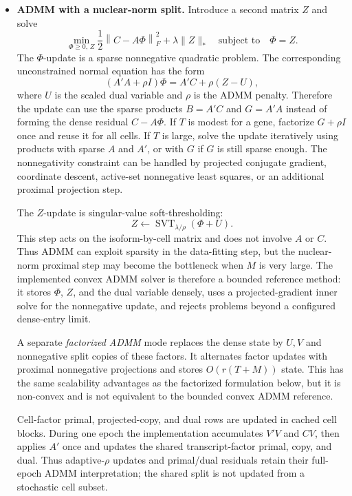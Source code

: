 \documentclass[11pt]{article}
\begin{document}
\begin{itemize}[leftmargin=*]
  \item \textbf{ADMM with a nuclear-norm split.} Introduce a second matrix
  \(Z\) and solve
  \[
    \min_{\Phi \ge 0,\,Z}
    \frac{1}{2}\left\|C-A\Phi\right\|_F^2
    + \lambda\|Z\|_*
    \quad\text{subject to}\quad
    \Phi = Z.
  \]
  The \(\Phi\)-update is a sparse nonnegative quadratic problem. The
  corresponding unconstrained normal equation has the form
  \[
    (A'A + \rho I)\Phi = A'C + \rho(Z-U),
  \]
  where \(U\) is the scaled dual variable and \(\rho\) is the ADMM penalty.
  Therefore the update can use the sparse products \(B=A'C\) and \(G=A'A\)
  instead of forming the dense residual \(C-A\Phi\). If \(T\) is modest for a
  gene, factorize \(G+\rho I\) once and reuse it for all cells. If \(T\) is
  large, solve the update iteratively using products with sparse \(A\) and
  \(A'\), or with \(G\) if \(G\) is still sparse enough. The nonnegativity
  constraint can be handled by projected conjugate gradient, coordinate
  descent, active-set nonnegative least squares, or an additional proximal
  projection step.

  The \(Z\)-update is singular-value soft-thresholding:
  \[
    Z \leftarrow
    \operatorname{SVT}_{\lambda/\rho}(\Phi + U).
  \]
  This step acts on the isoform-by-cell matrix and does not involve \(A\) or
  \(C\). Thus ADMM can exploit sparsity in the data-fitting step, but the
  nuclear-norm proximal step may become the bottleneck when \(M\) is very
  large. The implemented convex ADMM solver is therefore a bounded reference
  method: it stores \(\Phi\), \(Z\), and the dual variable densely, uses a
  projected-gradient inner solve for the nonnegative update, and rejects
  problems beyond a configured dense-entry limit.

  A separate \emph{factorized ADMM} mode replaces the dense state by
  \(U,V\) and nonnegative split copies of these factors. It alternates
  factor updates with proximal nonnegative projections and stores
  \(O(r(T+M))\) state. This has the same scalability advantages as the
  factorized formulation below, but it is non-convex and is not equivalent to
  the bounded convex ADMM reference.

  Cell-factor primal, projected-copy, and dual rows are updated in cached
  cell blocks. During one epoch the implementation accumulates
  \(V'V\) and \(C V\), then applies \(A'\) once and updates the shared
  transcript-factor primal, copy, and dual. Thus adaptive-\(\rho\) updates and
  primal/dual residuals retain their full-epoch ADMM interpretation; the
  shared split is not updated from a stochastic cell subset.


\end{itemize}
\end{document}
